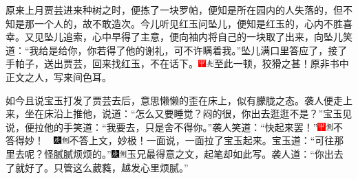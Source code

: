 原来上月贾芸进来种树之时，便拣了一块罗帕，便知是所在园内的人失落的，但不知是那一个人的，故不敢造次。今儿听见红玉问坠儿，便知是红玉的，心内不胜喜幸。又见坠儿追索，心中早得了主意，便向袖内将自己的一块取了出来，向坠儿笑道：``我给是给你，你若得了他的谢礼，可不许瞒着我。''坠儿满口里答应了，接了手帕子，送出贾芸，回来找红玉，不在话下。{\includegraphics[width=3mm]{../Images/00002}\includegraphics[width=3mm]{../Images/00012}\footnotesize \kaishu 至此一顿，狡猾之甚！原非书中正文之人，写来间色耳。}

如今且说宝玉打发了贾芸去后，意思懒懒的歪在床上，似有朦胧之态。袭人便走上来，坐在床沿上推他，说道：``怎么又要睡觉？闷的很，你出去逛逛不是？''宝玉见说，便拉他的手笑道：``我要去，只是舍不得你。''袭人笑道：``快起来罢！''{\includegraphics[width=3mm]{../Images/00002}\includegraphics[width=3mm]{../Images/00011}\footnotesize \kaishu 不答得妙！　\includegraphics[width=3mm]{../Images/00004}\includegraphics[width=3mm]{../Images/00011}\footnotesize \kaishu 不答上文，妙极！}一面说，一面拉了宝玉起来。宝玉道：``可往那里去呢？怪腻腻烦烦的。''{\includegraphics[width=3mm]{../Images/00004}\includegraphics[width=3mm]{../Images/00011}\footnotesize \kaishu 玉兄最得意之文，起笔却如此写。}袭人道：``你出去了就好了。只管这么葳蕤，越发心里烦腻。''

